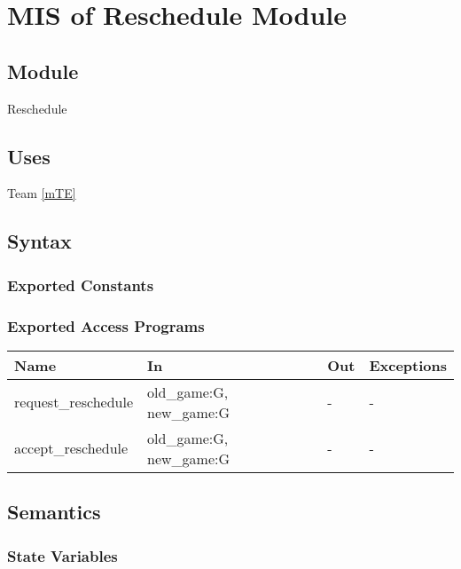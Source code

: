 \documentclass[12pt, titlepage]{article}
\begin{document}
\newpage

\section{MIS of Reschedule Module} \label{mRE}

\subsection{Module}

Reschedule

\subsection{Uses}

Team \ref{mTE}

\subsection{Syntax}

\subsubsection{Exported Constants}

\subsubsection{Exported Access Programs}

\begin{center}
\begin{tabular}{p{5cm} p{4cm} p{4cm} p{2cm}}
\hline
\textbf{Name} & \textbf{In} & \textbf{Out} & \textbf{Exceptions} \\
\hline
request\_reschedule & old\_game:G, new\_game:G & - & - \\
accept\_reschedule & old\_game:G, new\_game:G & - & - \\
\hline
\end{tabular}
\end{center}

\subsection{Semantics}

\subsubsection{State Variables}
\end{document}
